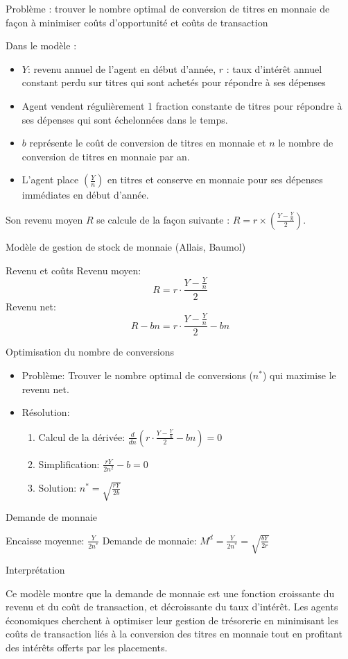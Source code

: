 \documentclass[a4paper, 12pt]{report}
\begin{document}
Problème : trouver le nombre optimal de conversion de titres en monnaie de façon à minimiser coûts d'opportunité et coûts de transaction

Dans le modèle :
\begin{itemize}
	\item $Y$: revenu annuel de l'agent en début d'année, $r$ : taux d'intérêt annuel constant perdu sur titres qui sont achetés pour répondre à ses dépenses
	\item Agent vendent régulièrement 1 fraction constante de titres pour répondre à ses dépenses qui sont échelonnées dans le temps.
	\item $b$ représente le coût de conversion de titres en monnaie et $n$ le nombre de conversion de titres en monnaie par an.
	\item L'agent place $(\frac{Y}{n})$ en titres et conserve en monnaie pour ses dépenses immédiates en début d'année.
\end{itemize}

Son revenu moyen $R$ se calcule de la façon suivante : $R = r \times (\frac{Y - \frac{Y}{n}}{2})$.

Modèle de gestion de stock de monnaie (Allais, Baumol)

Revenu et coûts
Revenu moyen:
$$R = r \cdot \frac{Y - \frac{Y}{n}}{2}$$
Revenu net:
$$R - bn = r \cdot \frac{Y - \frac{Y}{n}}{2} - bn$$

Optimisation du nombre de conversions
\begin{itemize}
	\item Problème: Trouver le nombre optimal de conversions ($n^*$) qui maximise le revenu net.
	\item Résolution:
	\begin{enumerate}
		\item Calcul de la dérivée: $\frac{d}{dn} \left( r \cdot \frac{Y - \frac{Y}{n}}{2} - bn \right) = 0$
		\item Simplification: $\frac{rY}{2n^2} - b = 0$
		\item Solution: $n^* = \sqrt{\frac{rY}{2b}}$
	\end{enumerate}
\end{itemize}

 Demande de monnaie

Encaisse moyenne: $\frac{Y}{2n^*}$
Demande de monnaie: $M^d = \frac{Y}{2n^*} = \sqrt{\frac{bY}{2r}}$

Interprétation

Ce modèle montre que la demande de monnaie est une fonction croissante du revenu et du coût de transaction, et décroissante du taux d'intérêt. Les agents économiques cherchent à optimiser leur gestion de trésorerie en minimisant les coûts de transaction liés à la conversion des titres en monnaie tout en profitant des intérêts offerts par les placements.
\end{document}
